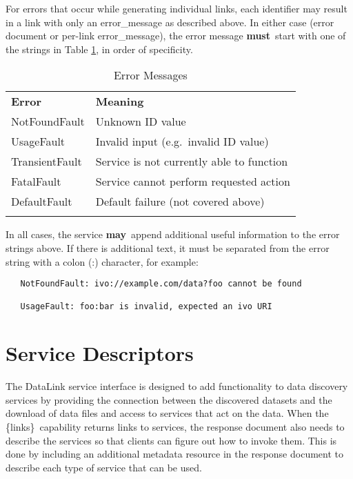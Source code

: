 \documentclass[11pt,a4paper]{ivoa}
\newcommand{\blinks}{\{links\}}
\newcommand{\rfcmust}{\textbf{must}}
\newcommand{\rfcmay}{\textbf{may}}
\begin{document}
For errors that occur while generating individual links, each
identifier may result in a link with only an error\_message
as described above.
In either case (error document or per-link error\_message),
the error message \rfcmust\ start with one of the strings in
Table \ref{tab:errors}, in order of specificity.
\begin{table}[ht]
\begin{center}
\begin{tabular}{|l|l|}
\sptablerule
{\bf Error} & {\bf Meaning} \\
\sptablerule
NotFoundFault  & Unknown ID value    \\
UsageFault     & Invalid input (e.g.\ invalid ID value) \\
TransientFault & Service is not currently able to function \\
FatalFault     & Service cannot perform requested action \\
DefaultFault   & Default failure (not covered above) \\
\sptablerule
\end{tabular}
\end{center}
\caption{Error Messages}
\label{tab:errors}
\end{table}

In all cases, the service \rfcmay\ append additional useful information to the
error strings above.
If there is additional text, it must be separated
from the error string with a colon (:) character, for example:
\begin{verbatim}
   NotFoundFault: ivo://example.com/data?foo cannot be found

   UsageFault: foo:bar is invalid, expected an ivo URI 
\end{verbatim}


\section{Service Descriptors}
\label{sec:serviceDescriptors}

The DataLink service interface is designed to add functionality to data
discovery services by providing the connection between the discovered
datasets and the download of data files and access to services that act
on the data. When the \blinks\ capability returns links to services, the
response document also needs to describe the services so that clients can
figure out how to invoke them. This is done by including an additional
metadata resource in the response document to describe each type of
service that can be used.
\end{document}
